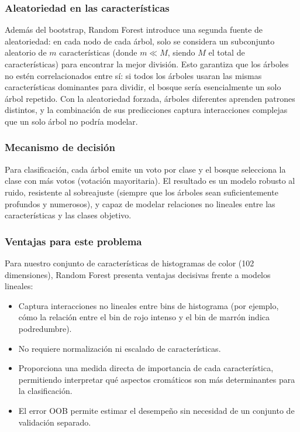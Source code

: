 \documentclass[conference]{IEEEtran}
\begin{document}
\subsubsection*{Aleatoriedad en las características}
Además del bootstrap, Random Forest introduce una segunda fuente de aleatoriedad: en cada nodo de cada árbol, solo se considera un subconjunto aleatorio de \(m\) características (donde \(m \ll M\), siendo \(M\) el total de características) para encontrar la mejor división. Esto garantiza que los árboles no estén correlacionados entre sí: si todos los árboles usaran las mismas características dominantes para dividir, el bosque sería esencialmente un solo árbol repetido. Con la aleatoriedad forzada, árboles diferentes aprenden patrones distintos, y la combinación de sus predicciones captura interacciones complejas que un solo árbol no podría modelar.

\subsubsection*{Mecanismo de decisión}
Para clasificación, cada árbol emite un voto por clase y el bosque selecciona la clase con más votos (votación mayoritaria). El resultado es un modelo robusto al ruido, resistente al sobreajuste (siempre que los árboles sean suficientemente profundos y numerosos), y capaz de modelar relaciones no lineales entre las características y las clases objetivo.

\subsubsection*{Ventajas para este problema}
Para nuestro conjunto de características de histogramas de color (102 dimensiones), Random Forest presenta ventajas decisivas frente a modelos lineales:
\begin{itemize}
  \item Captura interacciones no lineales entre bins de histograma (por ejemplo, cómo la relación entre el bin de rojo intenso y el bin de marrón indica podredumbre).
  \item No requiere normalización ni escalado de características.
  \item Proporciona una medida directa de importancia de cada característica, permitiendo interpretar qué aspectos cromáticos son más determinantes para la clasificación.
  \item El error OOB permite estimar el desempeño sin necesidad de un conjunto de validación separado.
\end{itemize}
\end{document}

